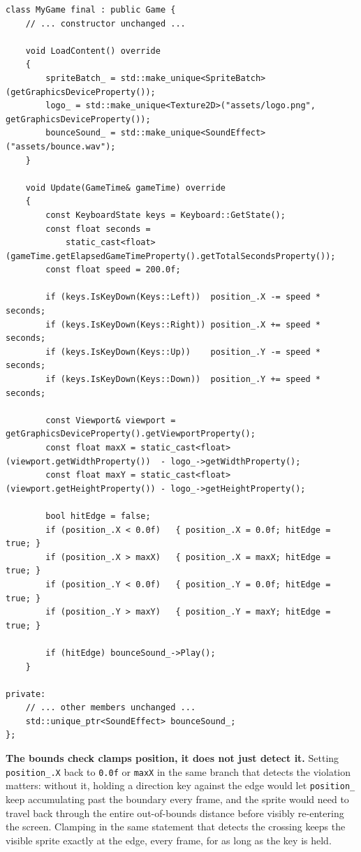 \begin{lstlisting}
class MyGame final : public Game {
    // ... constructor unchanged ...

    void LoadContent() override
    {
        spriteBatch_ = std::make_unique<SpriteBatch>(getGraphicsDeviceProperty());
        logo_ = std::make_unique<Texture2D>("assets/logo.png", getGraphicsDeviceProperty());
        bounceSound_ = std::make_unique<SoundEffect>("assets/bounce.wav");
    }

    void Update(GameTime& gameTime) override
    {
        const KeyboardState keys = Keyboard::GetState();
        const float seconds =
            static_cast<float>(gameTime.getElapsedGameTimeProperty().getTotalSecondsProperty());
        const float speed = 200.0f;

        if (keys.IsKeyDown(Keys::Left))  position_.X -= speed * seconds;
        if (keys.IsKeyDown(Keys::Right)) position_.X += speed * seconds;
        if (keys.IsKeyDown(Keys::Up))    position_.Y -= speed * seconds;
        if (keys.IsKeyDown(Keys::Down))  position_.Y += speed * seconds;

        const Viewport& viewport = getGraphicsDeviceProperty().getViewportProperty();
        const float maxX = static_cast<float>(viewport.getWidthProperty())  - logo_->getWidthProperty();
        const float maxY = static_cast<float>(viewport.getHeightProperty()) - logo_->getHeightProperty();

        bool hitEdge = false;
        if (position_.X < 0.0f)   { position_.X = 0.0f; hitEdge = true; }
        if (position_.X > maxX)   { position_.X = maxX; hitEdge = true; }
        if (position_.Y < 0.0f)   { position_.Y = 0.0f; hitEdge = true; }
        if (position_.Y > maxY)   { position_.Y = maxY; hitEdge = true; }

        if (hitEdge) bounceSound_->Play();
    }

private:
    // ... other members unchanged ...
    std::unique_ptr<SoundEffect> bounceSound_;
};
\end{lstlisting}

\textbf{The bounds check clamps position, it does not just detect it.} Setting
\texttt{position\_.X} back to \texttt{0.0f} or \texttt{maxX} in the same branch that detects
the violation matters: without it, holding a direction key against the edge would let
\texttt{position\_} keep accumulating past the boundary every frame, and the sprite would need
to travel back through the entire out-of-bounds distance before visibly re-entering the
screen. Clamping in the same statement that detects the crossing keeps the visible sprite
exactly at the edge, every frame, for as long as the key is held.

